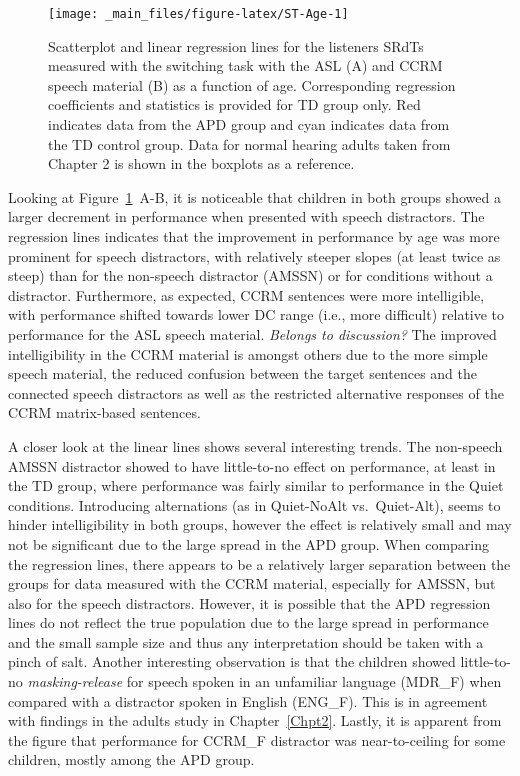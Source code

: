 \documentclass[a4paper, twoside]{templates/ociamthesis}
\begin{document}
\begin{figure}[h]

{\centering \texttt{[image: \_main\_files/figure-latex/ST-Age-1]} 

}

\caption{Scatterplot and linear regression lines for the listeners SRdTs measured with the switching task with the ASL (A) and CCRM speech material (B) as a function of age. Corresponding regression coefficients and statistics is provided for TD group only. Red indicates data from the APD group and cyan indicates data from the TD control group. Data for normal hearing adults taken from Chapter 2 is shown in the boxplots as a reference.}\label{fig:ST-Age}
\end{figure}

Looking at Figure~\ref{fig:ST-Age}~A-B, it is noticeable that children in both groups showed a larger decrement in performance when presented with speech distractors. The regression lines indicates that the improvement in performance by age was more prominent for speech distractors, with relatively steeper slopes (at least twice as steep) than for the non-speech distractor (AMSSN) or for conditions without a distractor. Furthermore, as expected, CCRM sentences were more intelligible, with performance shifted towards lower DC range (i.e., more difficult) relative to performance for the ASL speech material. \colorbox[HTML]{CCCCFF}{\emph{Belongs to discussion?}} The improved intelligibility in the CCRM material is amongst others due to the more simple speech material, the reduced confusion between the target sentences and the connected speech distractors as well as the restricted alternative responses of the CCRM matrix-based sentences.

A closer look at the linear lines shows several interesting trends. The non-speech AMSSN distractor showed to have little-to-no effect on performance, at least in the TD group, where performance was fairly similar to performance in the Quiet conditions. Introducing alternations (as in Quiet-NoAlt vs.~Quiet-Alt), seems to hinder intelligibility in both groups, however the effect is relatively small and may not be significant due to the large spread in the APD group. When comparing the regression lines, there appears to be a relatively larger separation between the groups for data measured with the CCRM material, especially for AMSSN, but also for the speech distractors. However, it is possible that the APD regression lines do not reflect the true population due to the large spread in performance and the small sample size and thus any interpretation should be taken with a pinch of salt. Another interesting observation is that the children showed little-to-no \emph{masking-release} for speech spoken in an unfamiliar language (MDR\_F) when compared with a distractor spoken in English (ENG\_F). This is in agreement with findings in the adults study in Chapter~\ref{Chpt2}. Lastly, it is apparent from the figure that performance for CCRM\_F distractor was near-to-ceiling for some children, mostly among the APD group.
\end{document}
